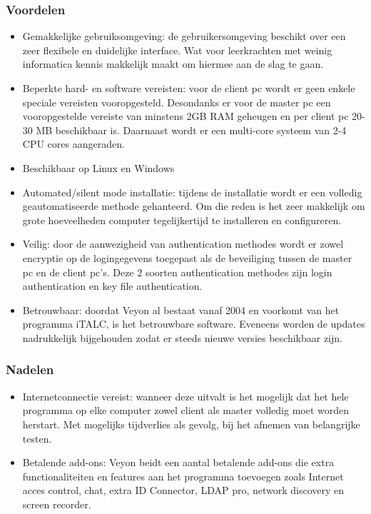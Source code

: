 \subsubsection{Voordelen}
\begin{itemize}
    \item Gemakkelijke gebruiksomgeving: de gebruikersomgeving beschikt over een zeer flexibele en duidelijke interface. Wat voor leerkrachten met weinig informatica kennis makkelijk maakt om hiermee aan de slag te gaan. 
    \item Beperkte hard- en software vereisten: voor de client pc wordt er geen enkele speciale vereisten vooropgesteld. Desondanks er voor de master pc een vooropgestelde vereiste van minstens 2GB RAM geheugen en per client pc 20-30 MB beschikbaar is. Daarnaast wordt er een multi-core systeem van 2-4 CPU cores aangeraden.   
    \item Beschikbaar op Linux en Windows
    \item Automated/silent mode installatie: tijdens de installatie wordt er een volledig geautomatiseerde methode gehanteerd. Om die reden is het zeer makkelijk om grote hoeveelheden computer tegelijkertijd te installeren en configureren. 
    \item Veilig: door de aanwezigheid van authentication methodes wordt er zowel encryptie op de logingegevens toegepast als de beveiliging tussen de master pc en de client pc's. Deze 2 soorten authentication methodes zijn login authentication en key file authentication.
    \item Betrouwbaar: doordat Veyon al bestaat vanaf 2004 en voorkomt van het programma iTALC, is het betrouwbare software. Eveneens worden de updates nadrukkelijk bijgehouden zodat er steeds nieuwe versies beschikbaar zijn.
    \autocite{veyon} 
\end{itemize}
\subsubsection{Nadelen}
\begin{itemize}
    \item Internetconnectie vereist: wanneer deze uitvalt is het mogelijk dat het hele programma op elke computer zowel client als master volledig moet worden herstart. Met mogelijks tijdverlies als gevolg, bij het afnemen van belangrijke testen. 
    \item Betalende add-ons: Veyon beidt een aantal betalende add-ons die extra functionaliteiten en features aan het programma toevoegen zoals Internet acces control, chat, extra ID Connector, LDAP pro,  network discovery en screen recorder.
    \autocite{junghans-2023}
\end{itemize}

